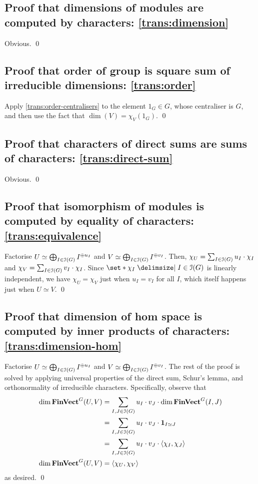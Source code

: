 \subsection{Proof that dimensions of modules are computed by characters: \ref{trans:dimension}} %
\pan Obvious. \qed

\subsection{Proof that order of group is square sum of irreducible dimensions: \ref{trans:order}} %
\pan Apply \ref{trans:order-centralisers} to the element $1_G \in G$, whose centraliser is $G$, and then use the fact that $\dim(V) = \chi_V (1_G)$. \qed

\subsection{Proof that characters of direct sums are sums of characters: \ref{trans:direct-sum}} %
\pan Obvious. \qed

\subsection{Proof that isomorphism of modules is computed by equality of characters: \ref{trans:equivalence}} %
\pan Factorise $U \simeq \bigoplus_{I \in \operatorname{\mathcal{I}}(G)} I^{\oplus u_I}$ and $V \simeq \bigoplus_{I \in \operatorname{\mathcal{I}}(G)} I^{\oplus v_I}$. Then, $\chi_U = \sum_{I \in \operatorname{\mathcal{I}}(G)} u_I \cdot \chi_I$ and $\chi_V = \sum_{I \in \operatorname{\mathcal{I}}(G)} v_I \cdot \chi_I$. Since $\set*{ \chi_I \given I \in \Irred(G) }$ is linearly independent, we have $\chi_U = \chi_V$ just when $u_I = v_I$ for all $I$, which itself happens just when $U \simeq V$. \qed

\subsection{Proof that dimension of hom space is computed by inner products of characters: \ref{trans:dimension-hom}} %
\pan Factorise $U \simeq \bigoplus_{I \in \operatorname{\mathcal{I}}(G)} I^{\oplus u_I}$ and $V \simeq \bigoplus_{I \in \operatorname{\mathcal{I}}(G)} I^{\oplus v_I}$. The rest of the proof is solved by applying universal properties of the direct sum, Schur's lemma, and orthonormality of irreducible characters. Specifically, observe that
\begin{align*}
  \dim \operatorname{\mathbf{FinVect}}^G (U, V)
  &= \sum_{I, J \in \operatorname{\mathcal{I}}(G)} u_I \cdot v_J \cdot \dim \operatorname{\mathbf{FinVect}}^G (I, J)
  \\
  &= \sum_{I, J \in \operatorname{\mathcal{I}}(G)} u_I \cdot v_J \cdot \mathbf{1}_{I \simeq J}
  \\
  &= \sum_{I, J \in \operatorname{\mathcal{I}}(G)} u_I \cdot v_J \cdot \langle \chi_I, \chi_J \rangle
  \\
  \dim \operatorname{\mathbf{FinVect}}^G (U, V)
  &= \langle \chi_U, \chi_V \rangle
\end{align*}
as desired. \qed

